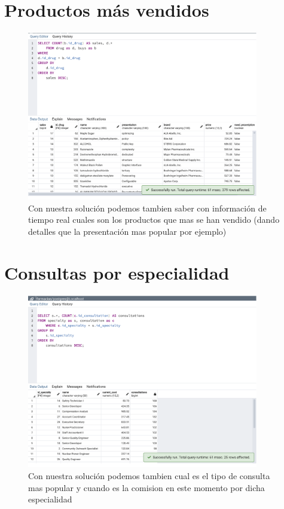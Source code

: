 \documentclass[12pt, fleqn]{report}                             %
\theoremstyle{break}                                            %
\begin{document}
        \clearpage
        \section{Productos más vendidos}
            
            \begin{figure}[ht]
                \includegraphics[width=0.9\textwidth]{4}
                \caption{Con nuestra solución podemos tambien saber con información de tiempo real cuales
                son los productos que mas se han vendido (dando detalles que la presentación mas popular por ejemplo)}
            \end{figure}
        
        \clearpage
        \section{Consultas por especialidad}
            
            \begin{figure}[ht]
                \includegraphics[width=0.9\textwidth]{5}
                \caption{Con nuestra solución podemos tambien cual es el tipo de consulta mas popular y cuando es
                la comision en este momento por dicha especialidad}
            \end{figure}
\end{document}

